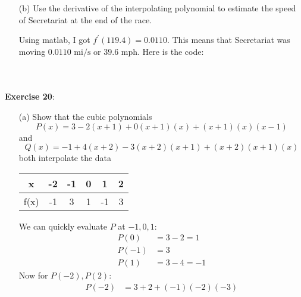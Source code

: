 \documentclass{article}
\begin{document}
\begin{itemize}
        \item [(b)] Use the derivative of the interpolating polynomial to estimate the speed of Secretariat at the end of the race. 
            \begin{answer}
                Using matlab, I got $f^{\prime}(119.4) = 0.0110$. This means that Secretariat was moving $0.0110 \text{ mi/s}$ or $39.6 \text{ mph}$. Here is the code:
        \inputminted{matlab}{code/NewtonForwardDifference/NewtonForwardDifference.m}
        \inputminted{matlab}{code/NewtonForwardDifference/forwardPoly.m}
        \inputminted{matlab}{code/script3.m}


            \end{answer}
    \end{itemize}

\textbf{Exercise 20}: 
    \begin{itemize}
        \item [(a)] Show that the cubic polynomials
            \begin{equation*}
                P(x) = 3 - 2(x + 1) + 0(x + 1)(x) + (x + 1)(x)(x - 1)
            \end{equation*}
        and
            \begin{equation*}
                Q(x) = -1 + 4(x + 2) - 3(x + 2)(x + 1) + (x + 2)(x + 1)(x)
            \end{equation*}
        both interpolate the data
            \begin{center}
                \begin{tabular}{ c c c c c c }
                    \hline x    & -2 & -1 & 0 & 1  & 2 \\
                    \hline f(x) & -1 & 3  & 1 & -1 & 3   
                \end{tabular}
            \end{center}
            \begin{answer}
                We can quickly evaluate $P$ at $-1, 0, 1$:
                    \begin{align*}
                        P(0)  &= 3 - 2 = 1  \\
                        P(-1) &= 3          \\
                        P(1)  &= 3 - 4 = -1   
                    \end{align*}
                Now for $P(-2), P(2)$:
                    \begin{align*}
                        P(-2) &= 3 + 2 + (-1)(-2)(-3) \\

\end{align*}
\end{answer}
\end{itemize}
\end{document}
